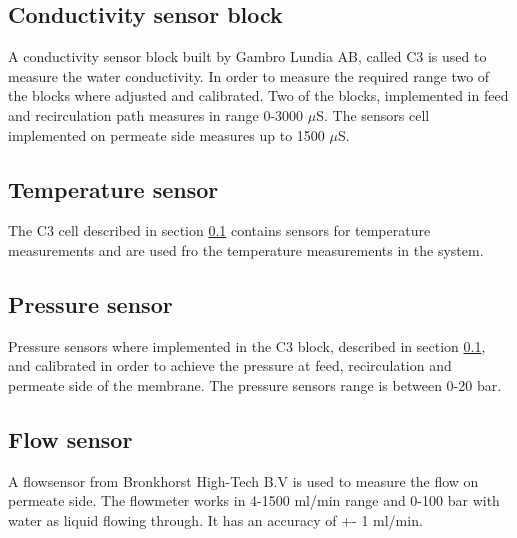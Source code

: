 \subsection{Conductivity sensor block}\label{senscond}
A conductivity sensor block built by Gambro Lundia AB, called C3 is used to measure the water conductivity. In order to measure the required range two of the blocks where adjusted and calibrated. Two of the blocks, implemented in feed and recirculation path measures in range 0-3000 $\mu$S. The sensors cell implemented on permeate side measures up to 1500 $\mu$S.

\subsection{Temperature sensor}\label{senstemp}
The C3 cell described in section \ref{senscond} contains sensors for temperature measurements and are used fro the temperature measurements in the system.

\subsection{Pressure sensor}\label{senspress}
Pressure sensors where implemented in the C3 block, described in section \ref{senscond}, and calibrated in order to achieve the pressure at feed, recirculation and permeate side of the membrane. The pressure sensors range is between 0-20 bar.


\subsection{Flow sensor}\label{sensflow}
A flowsensor from Bronkhorst High-Tech B.V is used to measure the flow on permeate side. The flowmeter works in 4-1500 ml/min range and 0-100 bar with water as liquid flowing through. It has an accuracy of +- 1 ml/min. 








